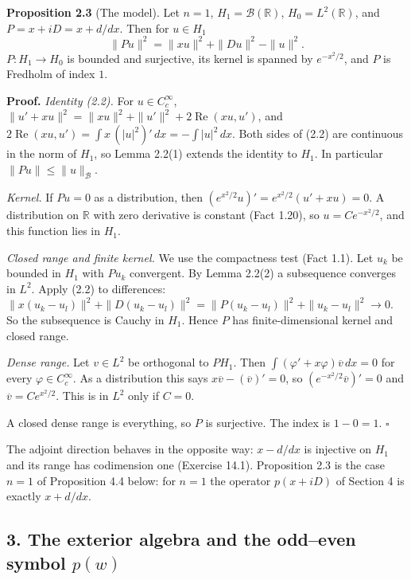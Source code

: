 \documentclass[
  11pt,
]{article}
\begin{document}
\textbf{Proposition 2.3} (The model). Let \(n=1\),
\(H_1=\mathcal B(\mathbb R)\), \(H_0=L^2(\mathbb R)\), and
\(P=x+iD=x+d/dx\). Then for \(u\in H_1\) \[
\|Pu\|^2=\|xu\|^2+\|Du\|^2-\|u\|^2 .
\tag{2.2}
\] \(P:H_1\to H_0\) is bounded and surjective, its kernel is spanned by
\(e^{-x^2/2}\), and \(P\) is Fredholm of index \(1\).

\textbf{Proof.} \emph{Identity (2.2).} For \(u\in C_c^\infty\),
\(\|u'+xu\|^2=\|xu\|^2+\|u'\|^2+2\operatorname{Re}(xu,u')\), and
\(2\operatorname{Re}(xu,u')=\int x\,(|u|^2)'\,dx=-\int|u|^2\,dx\). Both
sides of (2.2) are continuous in the norm of \(H_1\), so Lemma 2.2(1)
extends the identity to \(H_1\). In particular
\(\|Pu\|\le\|u\|_{\mathcal B}\).

\emph{Kernel.} If \(Pu=0\) as a distribution, then
\((e^{x^2/2}u)'=e^{x^2/2}(u'+xu)=0\). A distribution on \(\mathbb R\)
with zero derivative is constant (Fact 1.20), so \(u=Ce^{-x^2/2}\), and
this function lies in \(H_1\).

\emph{Closed range and finite kernel.} We use the compactness test (Fact
1.1). Let \(u_k\) be bounded in \(H_1\) with \(Pu_k\) convergent. By
Lemma 2.2(2) a subsequence converges in \(L^2\). Apply (2.2) to
differences:
\(\|x(u_k-u_l)\|^2+\|D(u_k-u_l)\|^2=\|P(u_k-u_l)\|^2+\|u_k-u_l\|^2\to0\).
So the subsequence is Cauchy in \(H_1\). Hence \(P\) has
finite-dimensional kernel and closed range.

\emph{Dense range.} Let \(v\in L^2\) be orthogonal to \(PH_1\). Then
\(\int(\varphi'+x\varphi)\overline v\,dx=0\) for every
\(\varphi\in C_c^\infty\). As a distribution this says
\(x\overline v-(\overline v)'=0\), so \((e^{-x^2/2}\overline v)'=0\) and
\(\overline v=Ce^{x^2/2}\). This is in \(L^2\) only if \(C=0\).

A closed dense range is everything, so \(P\) is surjective. The index is
\(1-0=1\). \(\square\)

The adjoint direction behaves in the opposite way: \(x-d/dx\) is
injective on \(H_1\) and its range has codimension one (Exercise 14.1).
Proposition 2.3 is the case \(n=1\) of Proposition 4.4 below: for
\(n=1\) the operator \(p(x+iD)\) of Section 4 is exactly \(x+d/dx\).

\subsection{\texorpdfstring{3. The exterior algebra and the odd--even
symbol
\(p(w)\)}{3. The exterior algebra and the odd--even symbol p(w)}}\label{the-exterior-algebra-and-the-oddeven-symbol-pw}
\end{document}
